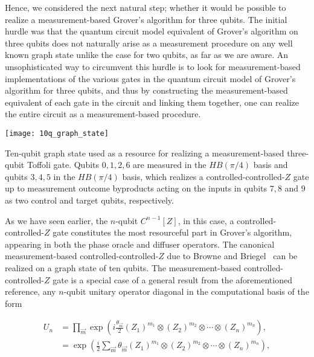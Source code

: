 \bigskip
\noindent
Hence, we considered the next natural step; whether it would be possible to realize a measurement-based Grover's algorithm for three qubits. The initial hurdle was that the quantum circuit model equivalent of Grover's algorithm on three qubits does not naturally arise as a measurement procedure on any well known graph state unlike the case for two qubits, as far as we are aware. An unsophisticated way to circumvent this hurdle is to look for measurement-based implementations of the various gates in the quantum circuit model of Grover's algorithm for three qubits, and thus by constructing the measurement-based equivalent of each gate in the circuit and linking them together, one can realize the entire circuit as a measurement-based procedure.

\begin{marginfigure}
	\centering
    \texttt{[image: 10q\_graph\_state]}
    \caption[Ten-qubit graph state used as a resource for realizing a measurement-based controlled-controlled-$Z$ gate.]{Ten-qubit graph state used as a resource for realizing a measurement-based three-qubit Toffoli gate. Qubits $0,1,2,6$ are measured in the $H B(\pi/4)$ basis and qubits $3,4,5$ in the $H B(\pi/4)$ basis, which realizes a controlled-controlled-$Z$ gate up to measurement outcome byproducts acting on the inputs in qubits $7,8$ and $9$ as two control and target qubits, respectively.}
\end{marginfigure}

\noindent
As we have seen earlier, the $n$-qubit $C^{n-1}[Z]$, in this case, a controlled-controlled-$Z$ gate constitutes the most resourceful part in Grover's algorithm, appearing in both the phase oracle and diffuser operators. The canonical measurement-based controlled-controlled-$Z$ due to Browne and Briegel~\cite{Browne_2016} can be realized on a graph state of ten qubits. The measurement-based controlled-controlled-$Z$ gate is a special case of a general result from the aforementioned reference, any $n$-qubit unitary operator diagonal in the computational basis of the form~\cite{Browne_2016}


\begin{align}
	U_n &= \displaystyle\prod_{\vec{m}} \exp(i \frac{\theta_{\vec{m}}}{2} (Z_1)^{m_1} \otimes (Z_2)^{m_2} \otimes \cdots \otimes (Z_n)^{m_n} ), \nonumber \\
	&= \exp(\frac{i}{2}\displaystyle\sum_{\vec{m}} \theta_{\vec{m}} (Z_1)^{m_1} \otimes (Z_2)^{m_2} \otimes \cdots \otimes (Z_n)^{m_n}),
\end{align}

